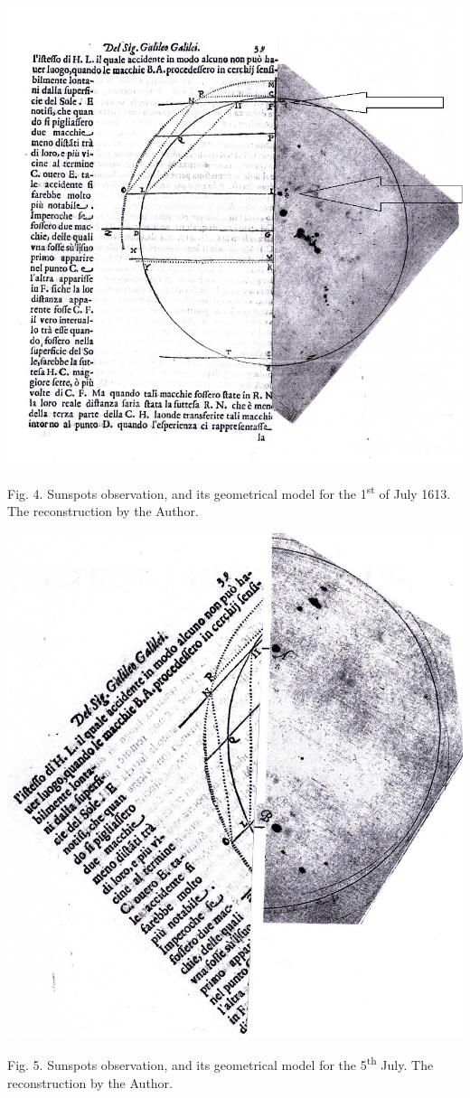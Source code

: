 \begin{artengenv}
{\centering  \includegraphics{Sierotowiczorg-img004.jpg} \par}
{\centering
Fig. 4. Sunspots observation, and its geometrical model for the 1\textsuperscript{st} of July 1613. The reconstruction
by the Author.
\par}

{\centering  \includegraphics{Sierotowiczorg-img005.jpg} \par}
{\centering
Fig. 5. Sunspots observation, and its geometrical model for the 5\textsuperscript{th} July. The reconstruction by the
Author.
\par}


\end{artengenv}
